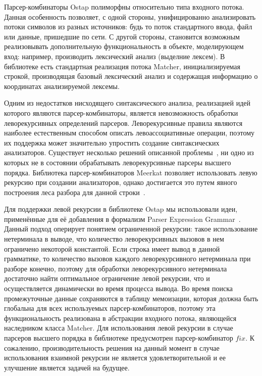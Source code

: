 \documentclass [a4paper] {article}
\begin{document}
Парсер-комбинаторы Ostap полиморфны относительно типа входного потока. Данная особенность позволяет, с одной стороны, унифицированно анализировать потоки символов из разных источников: будь то поток стандартного ввода, файл или данные, пришедшие по сети. С другой стороны, становится возможным реализовывать дополнительную функциональность в объекте, моделирующем вход: например, производить лексический анализ (выделние лексем). В библиотеке есть стандартная реализация потока Matcher, инициализируемая строкой, производящая базовый лексический анализ и содержащая информацию о координатах анализируемой лексемы. 

Одним из недостатков нисходящего синтаксического анализа, реализацией идей которого являются парсер-комбинаторы, является невозможность обработки леворекурсивных определений парсеров. Леворекурсивные правила являются наиболее естественным способом описать левоассоциативные операции, поэтому их поддержка может значительно упростить создание синтаксических анализаторов. Существует несколько решений описанной проблемы~\cite{frost2008parser, warth2008packrat}, ни одно из которых не в состоянии обрабатывать леворекурсивные парсеры высшего порядка. Библиотека парсер-комбинаторов Meerkat позволяет использовать левую рекурсию при создании анализаторов, однако достигается это путем явного построения леса разбора для данной строки~\cite{Izmaylova}.

Для поддержки левой рекурсии в библиотеке Ostap мы использовали идеи, применённые для её добавления в формализм Parser Expression Grammar~\cite{Medeiros2012}. Данный подход оперирует понятием ограниченной рекурсии: такое использование нетерминала в выводе, что количество леворекурсивных вызовов в нем ограничено некоторой константой. Если строка имеет вывод в данной грамматике, то количество вызовов каждого леворекурсивного нетерминала при разборе конечно, поэтому для обработки леворекурсивного нетерминала достаточно найти оптимальное ограничение левой рекурсии, что и осуществляется динамически во время процесса вывода. Во время поиска промежуточные данные сохраняются в таблицу мемоизации, которая должна быть глобальна для всех используемых парсер-комбинаторов, поэтому эта функциональность реализована в абстракции входного потока, являющейся наследником класса Matcher. Для использования левой рекурсии в случае парсеров высшего порядка в библиотеке предусмотрен парсер-комбинатор $fix$. К сожалению, производительность решения на данный момент в случае использования взаимной рекурсии не является удовлетворительной и ее улучшение является задачей на будущее. 

\printbibliography
\end{document}

